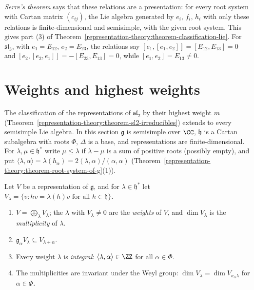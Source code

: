 \emph{Serre's theorem} \cite[Section 18.3]{humphreys-lie} says that these relations are a presentation: for every root system with Cartan matrix $(c_{ij})$, the Lie algebra generated by $e_i$,
$f_i$, $h_i$ with only these relations is finite-dimensional and semisimple, with the given root system. This gives part (3) of
Theorem~\ref{representation-theory:theorem-classification-lie}. For $\mathfrak{sl}_3$, with $e_1 = E_{12}$, $e_2 = E_{23}$, the relations say $[e_1, [e_1, e_2]] = [E_{12}, E_{13}] = 0$ and
$[e_2, [e_2, e_1]] = -[E_{23}, E_{13}] = 0$, while $[e_1, e_2] = E_{13} \neq 0$.

\section{Weights and highest weights}\label{representation-theory:section-highest-weight}

The classification of the representations of $\mathfrak{sl}_2$ by their highest weight $m$ (Theorem~\ref{representation-theory:theorem-sl2-irreducibles}) extends to every semisimple Lie
algebra. In this section $\mathfrak{g}$ is semisimple over $\CC$, $\mathfrak{h}$ is a Cartan subalgebra with roots $\Phi$, $\Delta$ is a base, and representations are finite-dimensional.
For $\lambda, \mu \in \mathfrak{h}^*$ write $\mu \leq \lambda$ if $\lambda - \mu$ is a sum of positive roots (possibly empty), and put
$\langle\lambda, \alpha\rangle = \lambda(h_\alpha) = 2(\lambda, \alpha)/(\alpha, \alpha)$ (Theorem~\ref{representation-theory:theorem-root-system-of-g}(1)).

\begin{proposition}\label{representation-theory:proposition-weights}
Let $V$ be a representation of $\mathfrak{g}$, and for $\lambda \in \mathfrak{h}^*$ let $V_\lambda = \{v : hv = \lambda(h)v \text{ for all } h \in \mathfrak{h}\}$.
\begin{enumerate}
\item $V = \bigoplus_\lambda V_\lambda$; the $\lambda$ with $V_\lambda \neq 0$ are the \emph{weights} of $V$, and $\dim V_\lambda$ is the \emph{multiplicity} of $\lambda$.
\item $\mathfrak{g}_\alpha V_\lambda \subseteq V_{\lambda + \alpha}$.
\item Every weight $\lambda$ is \emph{integral}: $\langle\lambda, \alpha\rangle \in \ZZ$ for all $\alpha \in \Phi$.
\item The multiplicities are invariant under the Weyl group: $\dim V_\lambda = \dim V_{\sigma_\alpha\lambda}$ for $\alpha \in \Phi$.
\end{enumerate}
\end{proposition}

